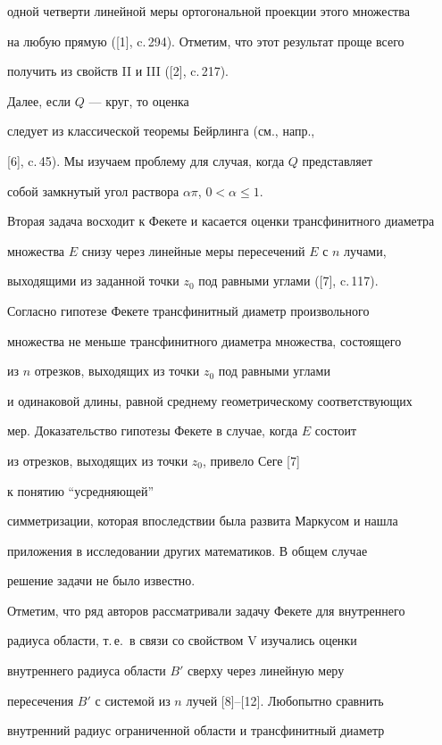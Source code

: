 одной четверти линейной меры ортогональной проекции этого множества


на любую прямую ([1], c.\,294). Отметим, что этот результат проще всего


получить из свойств II и III ([2], c.\,217).


Далее, если $Q$ --- круг, то оценка


следует из классической теоремы Бейрлинга (см., напр.,


[6], c.\,45). Мы изучаем проблему для случая, когда $Q$ представляет 


собой замкнутый угол раствора $\alpha\pi$, $0<\alpha\leq 1$.





Вторая задача восходит к Фекете и касается оценки трансфинитного диаметра


множества $E$ снизу через линейные меры пересечений $E$ с $n$ лучами,


выходящими из заданной точки $z_0$ под равными углами ([7], c.\,117).


Согласно гипотезе Фекете трансфинитный диаметр произвольного 


множества не меньше трансфинитного диаметра множества, состоящего 


из $n$ отрезков,  выходящих из точки $z_0$ под равными углами 


и одинаковой длины, равной среднему геометрическому соответствующих


мер. Доказательство гипотезы Фекете в случае, когда $E$ состоит


из отрезков, выходящих из точки $z_0$, привело Сеге [7]


к понятию ``усредняющей''


симметризации, которая впоследствии была развита Маркусом и нашла


приложения в исследовании других математиков. В общем случае


решение задачи не было известно.


Отметим, что ряд авторов рассматривали задачу Фекете для внутреннего


радиуса области, т.\,е.~в связи со свойством V изучались оценки 


внутреннего радиуса  области $B'$ сверху через линейную меру


пересечения $B'$ с системой из $n$ лучей [8]--[12]. Любопытно сравнить


внутренний радиус ограниченной области и трансфинитный диаметр


